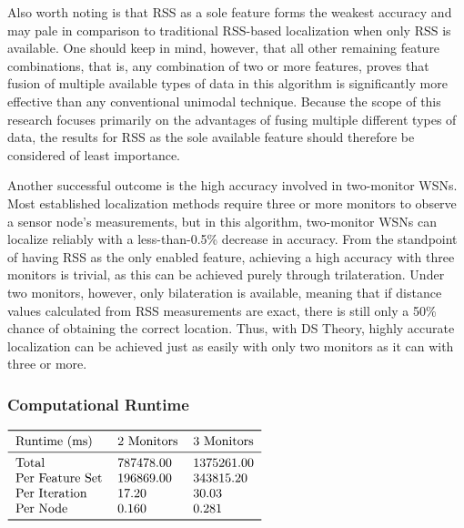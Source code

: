 \documentclass[12pt]{uthesis-v12}  %
\renewcommand{\arraystretch}{1.2}
\begin{document}
Also worth noting is that RSS as a sole feature forms the weakest accuracy and may pale in comparison to traditional RSS-based localization when only RSS is available. One should keep in mind, however, that all other remaining feature combinations, that is, any combination of two or more features, proves that fusion of multiple available types of data in this algorithm is significantly more effective than any conventional unimodal technique. Because the scope of this research focuses primarily on the advantages of fusing multiple different types of data, the results for RSS as the sole available feature should therefore be considered of least importance.

Another successful outcome is the high accuracy involved in two-monitor WSNs. Most established localization methods require three or more monitors to observe a sensor node's measurements, but in this algorithm, two-monitor WSNs can localize reliably with a less-than-0.5\% decrease in accuracy. From the standpoint of having RSS as the only enabled feature, achieving a high accuracy with three monitors is trivial, as this can be achieved purely through trilateration. Under two monitors, however, only bilateration is available, meaning that if distance values calculated from RSS measurements are exact, there is still only a 50\% chance of obtaining the correct location. Thus, with DS Theory, highly accurate localization can be achieved just as easily with only two monitors as it can with three or more.

\subsubsection{Computational Runtime}

\begin{table}[!t]
\renewcommand{\arraystretch}{1.3}
\caption{Runtime results for two-monitor and three-monitor WSNs.}
\label{table_run_time}
\centering
$\begin{tabular}{*{3}{l}}
\toprule
Runtime (ms) & 2 Monitors & 3 Monitors\\ \midrule
Total & 787478.00 & 1375261.00 \\
Per Feature Set & 196869.00 & 343815.20 \\
Per Iteration & 17.20 & 30.03 \\
Per Node & 0.160 & 0.281 \\ 
\bottomrule
\end{tabular}$
\end{table}
\end{document}
